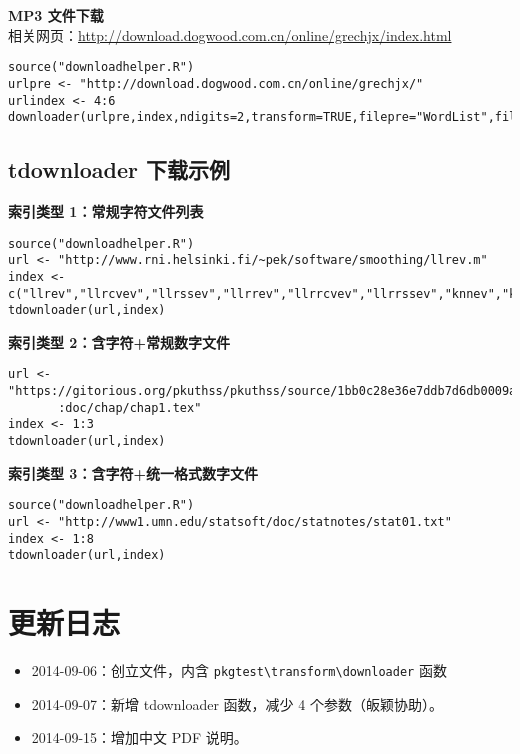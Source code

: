 \documentclass{article}
\begin{document}
\noindent \textbf{MP3 文件下载}\\
相关网页：\href{http://download.dogwood.com.cn/online/grechjx/index.html}{http://download.dogwood.com.cn/online/grechjx/index.html}

\begin{lstlisting}
source("downloadhelper.R")
urlpre <- "http://download.dogwood.com.cn/online/grechjx/"
urlindex <- 4:6
downloader(urlpre,index,ndigits=2,transform=TRUE,filepre="WordList",filetype="mp3")
\end{lstlisting}


\subsection{tdownloader 下载示例}

\noindent \textbf{索引类型 1：常规字符文件列表}
\begin{lstlisting}
source("downloadhelper.R")
url <- "http://www.rni.helsinki.fi/~pek/software/smoothing/llrev.m"
index <- c("llrev","llrcvev","llrssev","llrrev","llrrcvev","llrrssev","knnev","knncvev","knnssev","demo")
tdownloader(url,index)
\end{lstlisting}

\noindent \textbf{索引类型 2：含字符+常规数字文件}
\begin{lstlisting}
url <- "https://gitorious.org/pkuthss/pkuthss/source/1bb0c28e36e7ddb7d6db0009a1d154e1e3ef4c6c
       :doc/chap/chap1.tex"
index <- 1:3
tdownloader(url,index)
\end{lstlisting}

\noindent \textbf{索引类型 3：含字符+统一格式数字文件}
\begin{lstlisting}
source("downloadhelper.R")
url <- "http://www1.umn.edu/statsoft/doc/statnotes/stat01.txt"
index <- 1:8
tdownloader(url,index)
\end{lstlisting}

\section{更新日志}

\begin{itemize}
    \item 2014-09-06：创立文件，内含 \lstinline{pkgtest\transform\downloader} 函数
    \item 2014-09-07：新增 tdownloader 函数，减少 4 个参数（皈颖协助）。
    \item 2014-09-15：增加中文 PDF 说明。
\end{itemize}
\newpage
\end{document}
